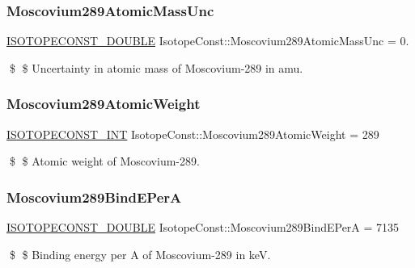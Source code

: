 \subsubsection{\texorpdfstring{Moscovium289\+Atomic\+Mass\+Unc}{Moscovium289AtomicMassUnc}}
{\footnotesize\ttfamily \mbox{\hyperlink{group___isotope_const-_macros_ga8f45a7272ce02c0b4c65c44636ed719a}{I\+S\+O\+T\+O\+P\+E\+C\+O\+N\+S\+T\+\_\+\+D\+O\+U\+B\+LE}} Isotope\+Const\+::\+Moscovium289\+Atomic\+Mass\+Unc = 0.}

\$ \$ Uncertainty in atomic mass of Moscovium-\/289 in amu. \mbox{\label{group___isotope_const-_moscovium-_mc289_gaeb308cb120a2217869c6561dac5d5084}} 
\subsubsection{\texorpdfstring{Moscovium289\+Atomic\+Weight}{Moscovium289AtomicWeight}}
{\footnotesize\ttfamily \mbox{\hyperlink{group___isotope_const-_macros_ga5f18360b3e99483a35c32d789e62621c}{I\+S\+O\+T\+O\+P\+E\+C\+O\+N\+S\+T\+\_\+\+I\+NT}} Isotope\+Const\+::\+Moscovium289\+Atomic\+Weight = 289}

\$ \$ Atomic weight of Moscovium-\/289. \mbox{\label{group___isotope_const-_moscovium-_mc289_gafa70b3010e7425bf54010ff4ee2a59a0}} 
\subsubsection{\texorpdfstring{Moscovium289\+Bind\+E\+PerA}{Moscovium289BindEPerA}}
{\footnotesize\ttfamily \mbox{\hyperlink{group___isotope_const-_macros_ga8f45a7272ce02c0b4c65c44636ed719a}{I\+S\+O\+T\+O\+P\+E\+C\+O\+N\+S\+T\+\_\+\+D\+O\+U\+B\+LE}} Isotope\+Const\+::\+Moscovium289\+Bind\+E\+PerA = 7135}

\$ \$ Binding energy per A of Moscovium-\/289 in keV. \mbox{\label{group___isotope_const-_moscovium-_mc289_ga34da71aa6c8101acf7bc2b36bb1361e2}} 
